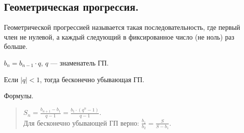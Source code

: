 \documentclass[12pt]{article}
\begin{document}
	\subsection{Геометрическая прогрессия.}
	\begin{definition}
		Геометрической прогрессией называется такая последовательность, где первый член не нулевой, а каждый следующий в фиксированное число (не ноль) раз больше.
	\end{definition}
	\begin{definition}
		$b_n = b_{n - 1} \cdot q$, $q$ --- знаменатель ГП.
	\end{definition}
	\begin{definition}
		Если $|q| < 1$, тогда бесконечно убывающая ГП.
	\end{definition}
	\begin{statement}
		Формулы.
		\begin{quote}
			$S_n = \frac{b_{n + 1} - b_1}{q - 1} = \frac{b_1 \cdot (q^n - 1)}{q - 1}$.\\
			Для бесконечно убывающей ГП верно: $\frac{b_1}{b_2} = \frac{S}{S - b_1}$.
		\end{quote}
	\end{statement}
\end{document}
